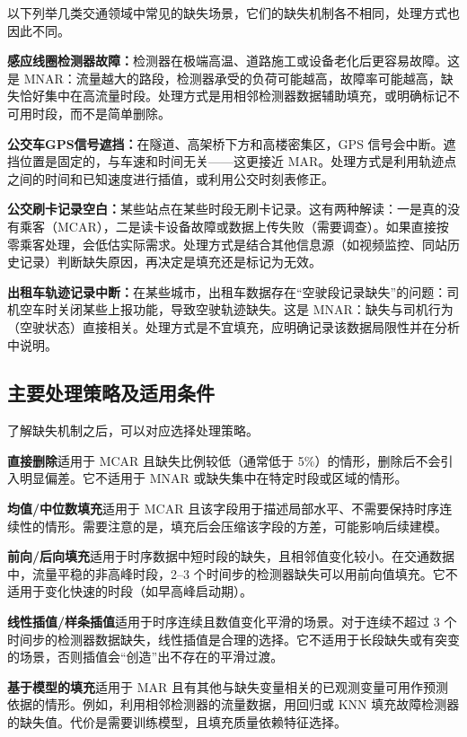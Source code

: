 以下列举几类交通领域中常见的缺失场景，它们的缺失机制各不相同，处理方式也因此不同。

\textbf{感应线圈检测器故障：}检测器在极端高温、道路施工或设备老化后更容易故障。这是 MNAR：流量越大的路段，检测器承受的负荷可能越高，故障率可能越高，缺失恰好集中在高流量时段。处理方式是用相邻检测器数据辅助填充，或明确标记不可用时段，而不是简单删除。

\textbf{公交车GPS信号遮挡：}在隧道、高架桥下方和高楼密集区，GPS 信号会中断。遮挡位置是固定的，与车速和时间无关——这更接近 MAR。处理方式是利用轨迹点之间的时间和已知速度进行插值，或利用公交时刻表修正。

\textbf{公交刷卡记录空白：}某些站点在某些时段无刷卡记录。这有两种解读：一是真的没有乘客（MCAR），二是读卡设备故障或数据上传失败（需要调查）。如果直接按零乘客处理，会低估实际需求。处理方式是结合其他信息源（如视频监控、同站历史记录）判断缺失原因，再决定是填充还是标记为无效。

\textbf{出租车轨迹记录中断：}在某些城市，出租车数据存在“空驶段记录缺失”的问题：司机空车时关闭某些上报功能，导致空驶轨迹缺失。这是 MNAR：缺失与司机行为（空驶状态）直接相关。处理方式是不宜填充，应明确记录该数据局限性并在分析中说明。

\subsection{主要处理策略及适用条件}

了解缺失机制之后，可以对应选择处理策略。

\textbf{直接删除}适用于 MCAR 且缺失比例较低（通常低于 5\%）的情形，删除后不会引入明显偏差。它不适用于 MNAR 或缺失集中在特定时段或区域的情形。

\textbf{均值/中位数填充}适用于 MCAR 且该字段用于描述局部水平、不需要保持时序连续性的情形。需要注意的是，填充后会压缩该字段的方差，可能影响后续建模。

\textbf{前向/后向填充}适用于时序数据中短时段的缺失，且相邻值变化较小。在交通数据中，流量平稳的非高峰时段，2--3 个时间步的检测器缺失可以用前向值填充。它不适用于变化快速的时段（如早高峰启动期）。

\textbf{线性插值/样条插值}适用于时序连续且数值变化平滑的场景。对于连续不超过 3 个时间步的检测器数据缺失，线性插值是合理的选择。它不适用于长段缺失或有突变的场景，否则插值会“创造”出不存在的平滑过渡。

\textbf{基于模型的填充}适用于 MAR 且有其他与缺失变量相关的已观测变量可用作预测依据的情形。例如，利用相邻检测器的流量数据，用回归或 KNN 填充故障检测器的缺失值。代价是需要训练模型，且填充质量依赖特征选择。

